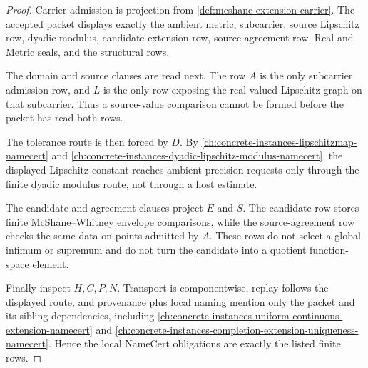 \begin{proof}
Carrier admission is projection from \autoref{def:mcshane-extension-carrier}. The accepted packet displays exactly the ambient metric, subcarrier, source Lipschitz row, dyadic modulus, candidate extension row, source-agreement row, Real and Metric seals, and the structural rows.

The domain and source clauses are read next. The row $A$ is the only subcarrier admission row, and $L$ is the only row exposing the real-valued Lipschitz graph on that subcarrier. Thus a source-value comparison cannot be formed before the packet has read both rows.

The tolerance route is then forced by $D$. By \autoref{ch:concrete-instances-lipschitzmap-namecert} and \autoref{ch:concrete-instances-dyadic-lipschitz-modulus-namecert}, the displayed Lipschitz constant reaches ambient precision requests only through the finite dyadic modulus route, not through a host estimate.

The candidate and agreement clauses project $E$ and $S$. The candidate row stores finite McShane--Whitney envelope comparisons, while the source-agreement row checks the same data on points admitted by $A$. These rows do not select a global infimum or supremum and do not turn the candidate into a quotient function-space element.

Finally inspect $H,C,P,N$. Transport is componentwise, replay follows the displayed route, and provenance plus local naming mention only the packet and its sibling dependencies, including \autoref{ch:concrete-instances-uniform-continuous-extension-namecert} and \autoref{ch:concrete-instances-completion-extension-uniqueness-namecert}. Hence the local NameCert obligations are exactly the listed finite rows.
\end{proof}

